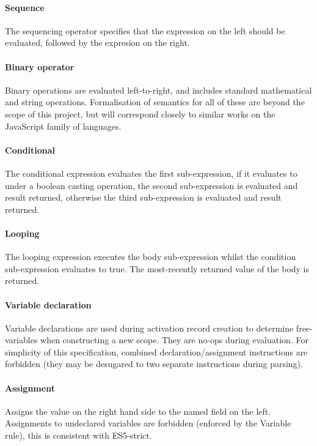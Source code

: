 \documentclass[a4paper]{article}
\begin{document}
\paragraph{Sequence} The sequencing operator specifies that the expression on the left should be
evaluated, followed by the expresion on the right.

\paragraph{Binary operator} Binary operations are evaluated left-to-right, and includes standard
mathematical and string operations. Formalisation of semantics for all of these
are beyond the scope of this project, but will correspond closely to similar
works on the JavaScript family of languages.

\paragraph{Conditional} The conditional expression evaluates the first sub-expression, if it evaluates
to  under a boolean casting operation, the second sub-expression is
evaluated and result returned, otherwise the third sub-expression is evaluated
and result returned.

\paragraph{Looping} The looping expression executes the body sub-expression whilst the condition
sub-expression evaluates to true. The most-recently returned value of the body
is returned.

\paragraph{Variable declaration} Variable declarations are used during activation
record creation to determine free-variables when constructing a new scope. They
are no-ops during evaluation. For simplicity of this specification, combined
declaration/assignment instructions are forbidden (they may be desugared to two
separate instructions during parsing).

\paragraph{Assignment} Assigns the value on the right hand side to the named
field on the left. Assignments to undeclared variables are forbidden (enforced
by the Variable rule), this is consistent with ES5-strict.
\end{document}
